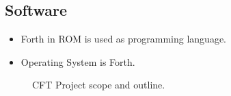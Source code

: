 \subsection{Software}

\begin{itemize}
\item Forth in ROM is used as programming language.
\item Operating System is Forth.
\end{itemize}

\begin{figure}[t!]
  \centering
  \caption{\label{fig-projectscope}CFT Project scope and outline.}
\end{figure}

